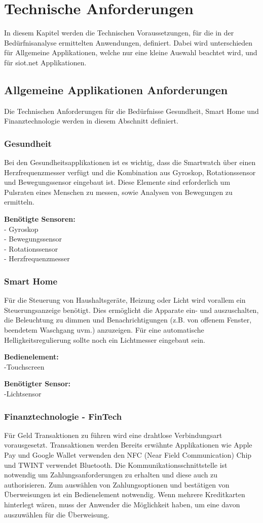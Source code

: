 \chapter{Technische Anforderungen}
In diesem Kapitel werden die Technischen Voraussetzungen, für die in der Bedürfnisanalyse ermittelten Anwendungen, definiert. Dabei wird unterschieden für Allgemeine Applikationen, welche nur eine kleine Auswahl beachtet wird, und für siot.net Applikationen.

\section{Allgemeine Applikationen Anforderungen}
Die Technischen Anforderungen für die Bedürfnisse Gesundheit, Smart Home und Finanztechnologie werden in diesem Abschnitt definiert.

\subsection{Gesundheit}
Bei den Gesundheitsapplikationen ist es wichtig, dass die Smartwatch über einen Herzfrequenzmesser verfügt und die Kombination aus Gyroskop, Rotationssensor und Bewegungssensor eingebaut ist.
Diese Elemente sind erforderlich um Pulsraten eines Menschen zu messen, sowie Analysen von Bewegungen zu ermitteln.

\textbf{Benötigte Sensoren:}\\
- Gyroskop\\
- Bewegungssensor\\
- Rotationssensor\\
- Herzfrequenzmesser

\subsection{Smart Home}
Für die Steuerung von Haushaltsgeräte, Heizung oder Licht wird vorallem ein Steuerungsanzeige benötigt. Dies ermöglicht die Apparate ein- und auszuschalten, die Beleuchtung zu dimmen und Benachrichtigungen (z.B. von offenem Fenster, beendetem Waschgang uvm.) anzuzeigen. Für eine automatische Helligkeitsregulierung sollte noch ein Lichtmesser eingebaut sein.

\textbf{Bedienelement:}\\
-Touchscreen

\textbf{Benötigter Sensor:}\\
-Lichtsensor

\subsection{Finanztechnologie - FinTech}
Für Geld Transaktionen zu führen wird eine drahtlose Verbindungsart vorausgesetzt. Transaktionen werden Bereits erwähnte Applikationen wie Apple Pay und Google Wallet verwenden den NFC (Near Field Communication) Chip und TWINT verwendet Bluetooth. Die Kommunikationsschnittstelle ist notwendig um Zahlungsanforderungen zu erhalten und diese auch zu authorisieren. Zum auswählen von Zahlungsoptionen und bestätigen von Überweisungen ist ein Bedienelement notwendig. Wenn mehrere Kreditkarten hinterlegt wären, muss der Anwender die Möglichkeit haben, um eine davon auszuwählen für die Überweisung.

